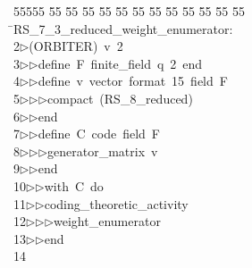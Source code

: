 %
%
\begin{tabbing}
55555 \= 55 \= 55 \= 55 \= 55 \= 55 \= 55 \= 55 \= 55 \= 55 \= 55 \= 55 \= 55 \= \>RS\_7\_3\_reduced\_weight\_enumerator:\\[0pt]
2\>$\triangleright$\>(ORBITER)\ v\ 2\ \\[0pt]
3\>$\triangleright$\>$\triangleright$\>define\ F\ finite\_field\ q\ 2\ end\ \\[0pt]
4\>$\triangleright$\>$\triangleright$\>define\ v\ vector\ format\ 15\ field\ F\ \\[0pt]
5\>$\triangleright$\>$\triangleright$\>$\triangleright$\>compact\ (RS\_8\_reduced)\ \\[0pt]
6\>$\triangleright$\>$\triangleright$\>end\ \\[0pt]
7\>$\triangleright$\>$\triangleright$\>define\ C\ code\ field\ F\ \\[0pt]
8\>$\triangleright$\>$\triangleright$\>$\triangleright$\>generator\_matrix\ v\ \\[0pt]
9\>$\triangleright$\>$\triangleright$\>end\ \\[0pt]
10\>$\triangleright$\>$\triangleright$\>with\ C\ do\ \\[0pt]
11\>$\triangleright$\>$\triangleright$\>coding\_theoretic\_activity\ \\[0pt]
12\>$\triangleright$\>$\triangleright$\>$\triangleright$\>weight\_enumerator\ \\[0pt]
13\>$\triangleright$\>$\triangleright$\>end\\[0pt]
14\>\end{tabbing}
